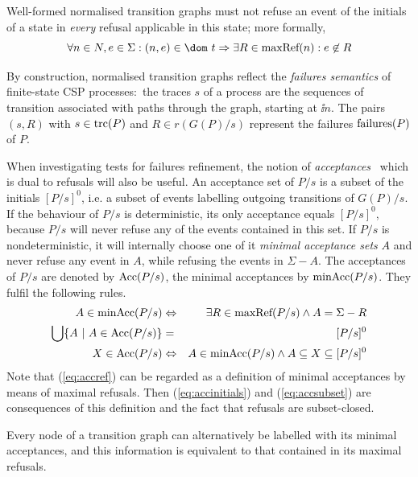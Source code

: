 Well-formed normalised transition graphs must not refuse an event of the
initials of a state in {\it every} refusal applicable in this state; more
formally,
\begin{equation}
\label{eq:wellformedg}
\forall n\in N, e\in\Sigma: (n,e)\in\dom~t \Rightarrow
\exists R\in \maxrefs(n): e\not\in R
\end{equation}


By construction, normalised transition graphs reflect the \emph{failures
semantics} of finite-state CSP processes:~the traces $s$ of a process are the
sequences of transition associated with paths through the graph,
starting at $\ii n$. The pairs $(s,R)$ with $s\in\text{trc}(P)$ and $R\in
r(G(P)/s)$ represent the failures ${\text {\rm failures}}(P)$ of $P$.

When investigating  tests for failures refinement, 
the notion of \emph{acceptances}~\cite{Hennessy:1988:ATP:50497} 
which is dual to refusals will also be useful. An acceptance set of $P/s$ is a subset
of the initials $[P/s]^0$, i.e. a subset of events labelling  outgoing transitions
of $G(P)/s$. If the behaviour of  $P/s$ is deterministic, its only acceptance equals
$[P/s]^0$, because $P/s$ will never refuse any of the events contained in this set. If
$P/s$ is nondeterministic, it will internally choose one of it 
\emph{minimal acceptance sets} $A$ and never refuse any event in $A$, while refusing the
events in $\Sigma-A$. The acceptances of 
 $P/s$ are denoted by $\text{Acc}(P/s)$, the minimal acceptances by $\text{minAcc}(P/s)$. 
 They fulfil the following rules.
\begin{eqnarray}
A\in \text{minAcc}(P/s) & \Leftrightarrow & \exists R\in\text{maxRef}(P/s) \wedge A = \Sigma-R
\label{eq:accref}
\\
\bigcup \{ A~|~A\in \text{Acc}(P/s)\} & = & [P/s]^0
\label{eq:accinitials}
\\
 X\in\text{Acc}(P/s) &\Leftrightarrow & A\in \text{minAcc}(P/s) \wedge A\subseteq X \subseteq [P/s]^0
 \label{eq:accsubset}
\end{eqnarray} 
Note that (\ref{eq:accref}) can be regarded as a definition of minimal acceptances by means
of maximal refusals. Then (\ref{eq:accinitials}) and (\ref{eq:accsubset}) are consequences
of this definition and  the fact that refusals are subset-closed.

Every node of a transition graph can alternatively 
be labelled  with its minimal acceptances, and this information is equivalent to 
that contained in its maximal refusals.

